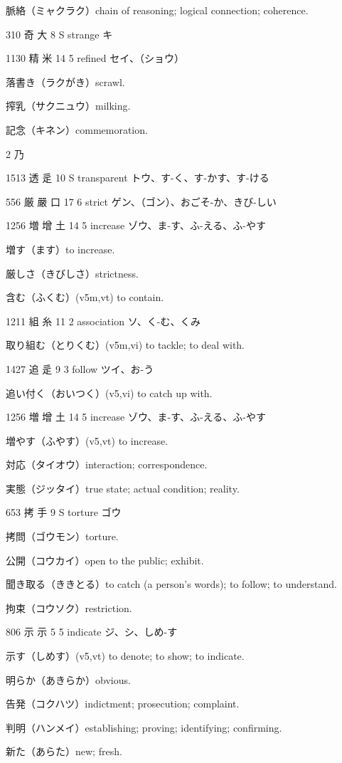 脈絡（ミャクラク）chain of reasoning; logical connection; coherence.

310	奇		大	8	S		strange	キ

1130	精		米	14	5		refined	セイ、（ショウ）

落書き（ラクがき）scrawl.

搾乳（サクニュウ）milking.

記念（キネン）commemoration.

2 乃

1513	透		辵	10	S		transparent	トウ、す-く、す-かす、す-ける

556	厳	嚴	口	17	6		strict	ゲン、（ゴン）、おごそ-か、きび-しい

1256	増	增	土	14	5		increase	ゾウ、ま-す、ふ-える、ふ-やす

増す（ます）to increase.

厳しさ（きびしさ）strictness.

含む（ふくむ）(v5m,vt) to contain.

1211	組		糸	11	2		association	ソ、く-む、くみ

取り組む（とりくむ）(v5m,vi) to tackle; to deal with.

1427	追		辵	9	3		follow	ツイ、お-う

追い付く（おいつく）(v5,vi) to catch up with.

1256	増	增	土	14	5		increase	ゾウ、ま-す、ふ-える、ふ-やす

増やす（ふやす）(v5,vt) to increase.

対応（タイオウ）interaction; correspondence.

実態（ジッタイ）true state; actual condition; reality.

653	拷		手	9	S		torture	ゴウ

拷問（ゴウモン）torture.

公開（コウカイ）open to the public; exhibit.

聞き取る（ききとる）to catch (a person's words); to follow; to understand.

拘束（コウソク）restriction.

806	示		示	5	5		indicate	ジ、シ、しめ-す

示す（しめす）(v5,vt) to denote; to show; to indicate.

明らか（あきらか）obvious.

告発（コクハツ）indictment; prosecution; complaint.

判明（ハンメイ）establishing; proving; identifying; confirming.

新た（あらた）new; fresh.

